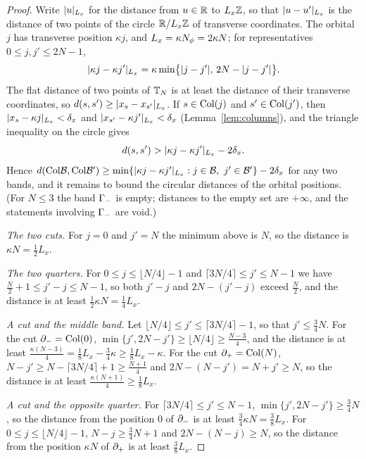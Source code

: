 \begin{proof}
Write $\lvert u\rvert_{L_x}$ for the distance from $u\in\mathbb{R}$ to $L_x\mathbb{Z}$, so that $\lvert u-u'\rvert_{L_x}$ is the distance of two
points of the circle $\mathbb{R}/L_x\mathbb{Z}$ of transverse coordinates. The orbital $j$ has transverse position $\kappa j$, and
$L_x=\kappa N_{\phi}=2\kappa N$; for representatives $0\le j,j'\le2N-1$,
\[
\lvert\kappa j-\kappa j'\rvert_{L_x}=\kappa\min\bigl\{\lvert j-j'\rvert,\,2N-\lvert j-j'\rvert\bigr\}.
\]
The flat distance of two points of $\mathbb{T}_N$ is at least the distance of their transverse coordinates, so
$d(s,s')\ge\lvert x_s-x_{s'}\rvert_{L_x}$. If $s\in\mathrm{Col}(j)$ and $s'\in\mathrm{Col}(j')$, then $\lvert x_s-\kappa j\rvert_{L_x}<\delta_x$ and
$\lvert x_{s'}-\kappa j'\rvert_{L_x}<\delta_x$ (Lemma~\ref{lem:columns}), and the triangle inequality on the circle gives
\begin{equation}\label{eq:ix-coldist}
d(s,s')>\lvert\kappa j-\kappa j'\rvert_{L_x}-2\delta_x .
\end{equation}
Hence $d(\Col\mathcal B,\Col\mathcal B')\ge\min\{\abs{\kappa j-\kappa j'}_{L_x}:j\in\mathcal B,\ j'\in\mathcal B'\}-2\delta_x$ for
any two bands, and it remains to bound the circular distances of the orbital positions. (For $N\le3$ the band
$\Gamma_{-}$ is empty; distances to the empty set are $+\infty$, and the statements involving $\Gamma_{-}$ are void.)

\emph{The two cuts.} For $j=0$ and $j'=N$ the minimum above is $N$, so the distance is $\kappa N=\frac12L_x$.

\emph{The two quarters.} For $0\le j\le\lfloor N/4\rfloor-1$ and $\lceil3N/4\rceil\le j'\le N-1$ we have
$\frac N2+1\le j'-j\le N-1$, so both $j'-j$ and $2N-(j'-j)$ exceed $\frac N2$, and the distance is at least
$\frac12\kappa N=\frac14L_x$.

\emph{A cut and the middle band.} Let $\lfloor N/4\rfloor\le j'\le\lceil3N/4\rceil-1$, so that $j'\le\frac34N$. For the
cut $\partial_{-}=\mathrm{Col}(0)$, $\min\{j',2N-j'\}\ge\lfloor N/4\rfloor\ge\frac{N-3}4$, and the distance is at least
$\frac{\kappa(N-3)}4=\frac18L_x-\frac34\kappa\ge\frac18L_x-\kappa$. For the cut $\partial_{+}=\mathrm{Col}(N)$,
$N-j'\ge N-\lceil3N/4\rceil+1\ge\frac{N+1}4$ and $2N-(N-j')=N+j'\ge N$, so the distance is at least
$\frac{\kappa(N+1)}4\ge\frac18L_x$.

\emph{A cut and the opposite quarter.} For $\lceil3N/4\rceil\le j'\le N-1$, $\min\{j',2N-j'\}\ge\frac34N$, so the
distance from the position $0$ of $\partial_{-}$ is at least $\frac34\kappa N=\frac38L_x$. For $0\le j\le\lfloor N/4\rfloor-1$,
$N-j\ge\frac34N+1$ and $2N-(N-j)\ge N$, so the distance from the position $\kappa N$ of $\partial_{+}$ is at least $\frac38L_x$.


\end{proof}
